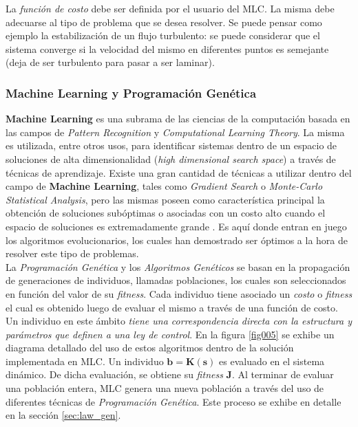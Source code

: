 \documentclass[a4paper,10pt]{article}
\begin{document}
        \indent La \textit{función de costo} debe ser definida por el usuario del MLC. La misma debe adecuarse al tipo de problema que se 
        desea resolver. Se puede pensar como ejemplo la estabilización de un flujo turbulento: se puede considerar que el sistema converge 
        si la velocidad del mismo en diferentes puntos es semejante (deja de ser turbulento para pasar a ser laminar).

    \subsubsection{Machine Learning y Programación Genética} \label{sec:mlc_and_gp}
        \textbf{Machine Learning} es una subrama de las ciencias de la computación basada en las campos de \textit{Pattern Recognition} y
        \textit{Computational Learning Theory}. La misma es utilizada, entre otros usos, para identificar sistemas dentro de un espacio de
        soluciones de alta dimensionalidad (\textit{high dimensional search space}) a través de técnicas de aprendizaje. Existe una gran
        cantidad de técnicas a utilizar dentro del campo de \textbf{Machine Learning}, tales como \textit{Gradient Search} o
        \textit{Monte-Carlo Statistical Analysis}, pero las mismas poseen como característica principal la obtención de soluciones
        subóptimas o asociadas con un costo alto cuando el espacio de soluciones es extremadamente grande \cite{Duriez2016}. Es aquí
        donde entran en juego los algoritmos
        evolucionarios, los cuales han demostrado ser óptimos a la hora de resolver este tipo de problemas. \\

        \indent La \textit{Programación Genética} y los \textit{Algoritmos Genéticos} se basan en la propagación de generaciones de
        individuos, llamadas poblaciones, los cuales son seleccionados en función del valor de su \textit{fitness}. Cada individuo tiene
        asociado un \textit{costo} o \textit{fitness} el cual es obtenido luego de evaluar el mismo a través de una función de costo.
        Un individuo en este ámbito \textit{tiene una correspondencia directa con la estructura y parámetros que definen
        a una ley de control}. En la figura \ref{fig005} se exhibe un diagrama detallado del uso de estos algoritmos dentro de la solución
        implementada en MLC. Un individuo $\mathbf{b = K(s)}$ es evaluado en el sistema dinámico. De dicha evaluación, se obtiene su
        \textit{fitness} \textbf{J}. Al terminar de evaluar una población entera, MLC genera una nueva población a través del uso de
        diferentes técnicas de \textit{Programación Genética}. Este proceso se exhibe en detalle en la sección \ref{sec:law_gen}.
\end{document}
